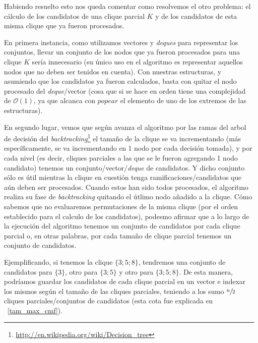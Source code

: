 \par Habiendo resuelto esto nos queda comentar como resolvemos el otro problema:
    el c\'alculo de los candidatos de una clique parcial $K$ y de los candidatos
    de esta misma clique que ya fueron procesados.

\par En primera instancia, como utilizamos vectores y \emph{deques} para representar
    los conjuntos, llevar un conjunto de los nodos que ya fueron procesados para una
    clique $K$ ser\'ia innecesario (su \'unico uso en el algoritmo es representar
    aquellos nodos que no deben ser tenidos en cuenta). Con nuestras estructuras,
    y asumiendo que los candidatos ya fueron calculados, basta con quitar el nodo
    procesado del \emph{deque}/vector (cosa que si se hace en orden tiene una complejidad
    de $\mathcal O(1)$, ya que alcanca con $popear$ el elemento de uno de los extremos
    de las estructuras).

\par En segundo lugar, vemos que seg\'un avanza el algoritmo por las ramas del
    arbol de decisi\'on del \emph{backtracking}\footnote{\url{http://en.wikipedia.org/wiki/Decision_tree}}
    el tama\~no de la clique se va incrementando (m\'as espec\'ificamente, se va
    incrementando en 1 nodo por cada decisi\'on tomada), y por cada nivel (es decir,
    cliques parciales a las que se le fueron agregando 1 nodo candidato) tenemos
    un conjunto/vector/\emph{deque} de candidatos. Y dicho conjunto s\'olo es
    \'util mientras la clique en cuesti\'on tenga ramificaciones/candidatos
    que a\'un deben ser procesados. Cuando estos han sido todos procesados, el
    algoritmo realiza su fase de \emph{backtracking} quitando el \'utlimo
    nodo a\~nadido a la clique. C\'omo sabemos que no evaluaremos permutaciones
    de la misma clique (por el orden establecido para el calculo de los candidatos),
    podesmo afirmar que a lo largo de la ejecuci\'on del algoritmo tenemos
    un conjunto de candidatos por cada clique parcial o, en otras palabras,
    por cada tama\~no de clique parcial tenemos un conjunto de candidatos.

\par Ejemplificando, si tenemos la clique $\{3;5;8\}$, tendremos una conjunto
    de candidatos para $\{3\}$, otro para $\{3;5\}$ y otro para $\{3;5;8\}$.
    De esta manera, podr\'iamos guardar los candidatos de cada clique parcial
    en un vector e indexar los mismos seg\'un el tama\~no de las cliques
    parciales, teniendo a los sumo $\sfrac{n}{2}$ cliques parciales/conjuntos
    de candidatos (esta cota fue explicada en ~\ref{tam_max_cmf}).

